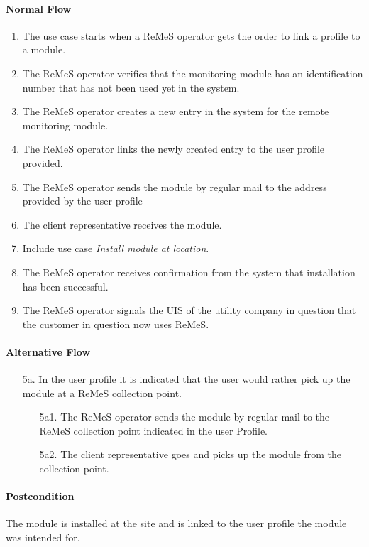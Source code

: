 \paragraph{Normal Flow}
\begin{enumerate}
	\item The use case starts when a ReMeS operator gets the order to link a profile to a module.
	\item The ReMeS operator verifies that the monitoring module has an identification number that has not been used yet in the system. 
	\item The ReMeS operator creates a new entry in the system for the remote monitoring module.
	\item The ReMeS operator links the newly created entry to the user profile provided. 
	\item The ReMeS operator sends the module by regular mail to the address provided by the user profile
	\item The client representative receives the module. 
	\item Include use case \textit{Install module at location}.
	\item The ReMeS operator receives confirmation from the system that installation has been successful.
	\item The ReMeS operator signals the UIS of the utility company in question that the customer in 
question now uses ReMeS.
\end{enumerate}

\paragraph{Alternative Flow}
\begin{enumerate}
	\item[5a.] In the user profile it is indicated that the user would rather pick up the module
at a ReMeS collection point. 
	\begin{enumerate}
		\item[5a1.] The ReMeS operator sends the module by regular mail to the ReMeS collection point indicated in the user Profile. 
		\item[5a2.] The client representative goes and picks up the module from the collection point.
	\end{enumerate}
\end{enumerate}

\paragraph{Postcondition}
The module is installed at the site and is linked to the user profile the module was intended for.
